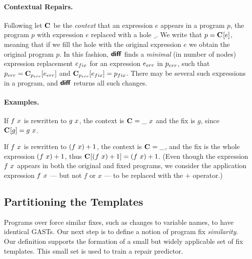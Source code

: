 \paragraph{Contextual Repairs.}
%
Following \cite{Felleisen92} let $\mathbf{C}_{}$ be the \emph{context} that an
expression $e$ appears in a program $p$, \ie the program $p$ with expression $e$
replaced with a hole $\_$.
%
We write that $p = \mathbf{C}_{}[e]$, meaning that if we fill the hole with the
original expression $e$ we obtain the original program $p$.
%
In this fashion, $\bm{\mathsf{diff}}$ finds a \emph{minimal} (in number of nodes)
expression replacement $e_{fix}$ for an expression $e_{err}$ in $p_{err}$, such that
$p_{err} = \mathbf{C}_{p_{err}}[e_{err}]$ and $\mathbf{C}_{p_{err}}[e_{fix}] = p_{fix}$.
%
There may be several such expressions in a program, and $\bm{\mathsf{diff}}$ returns all
such changes.

\paragraph{Examples.} If $f\ x$ is rewritten to $g\ x$, the context is
$\mathbf{C}_{} = \_\ x$ and the fix is $g$, since $\mathbf{C}_{}[g] = g\ x$.

If $f\ x$ is rewritten to $(f\ x) + 1$, the context is
$\mathbf{C}_{} = \_$, and the fix is the whole expression
$(f\ x) + 1$, thus $\mathbf{C}_{}[(f\ x) + 1] =
(f\ x) + 1$. (Even though the expression $f\ x$ appears in
both the original and fixed programs, we consider the application expression
$f\ x$ --- but not $f$ or $x$ --- to be replaced with the $+$ operator.)

\subsection{Partitioning the Templates}

Programs over \lang force similar fixes, such as changes to variable names, to
have identical GASTs. Our next step is to define a notion of program fix
\emph{similarity}. Our definition supports the formation of a small but widely
applicable set of fix templates. This small set is used to train a repair
predictor.

\label{subsec:partitioning}


